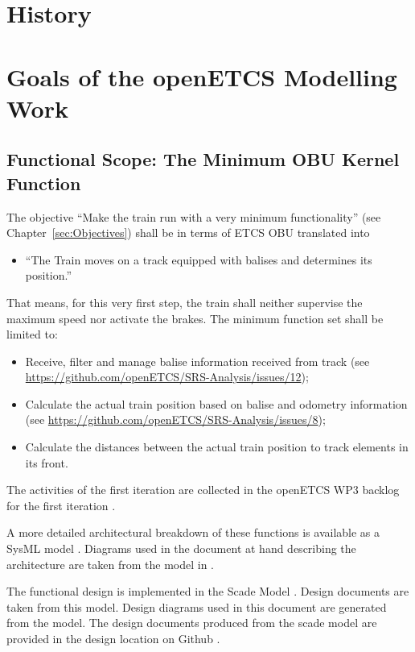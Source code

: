 \documentclass{template/openetcs_report}
\begin{document}
\section{History}

\section{Goals of the openETCS Modelling Work}


\subsection{Functional Scope: The Minimum OBU Kernel Function}
\label{sec:FunctionalScopeTheMinimumOBUKernelFunction}

The objective ``Make the train run with a very minimum functionality'' (see Chapter~\ref{sec:Objectives}) shall be in terms of ETCS OBU translated into 
\begin{itemize}
	\item ``The Train moves on a track equipped with balises and determines its position.''
\end{itemize}
That means, for this very first step, the train shall neither supervise the maximum speed nor activate the brakes. The minimum function set shall be limited to:
\begin{itemize}
	\item Receive, filter and manage balise information received from track (see \url{https://github.com/openETCS/SRS-Analysis/issues/12});
	\item Calculate the actual train position based on balise and odometry information (see \url{https://github.com/openETCS/SRS-Analysis/issues/8});
	\item Calculate the distances between the actual train position to track elements in its front.
\end{itemize}
The activities of the first iteration are collected in the openETCS WP3 backlog for the first iteration \cite{firstIteration}.

A more detailed architectural breakdown of these functions is available as a SysML model \cite{sysml-model}. Diagrams used in the document at hand describing the architecture are taken from the model in \cite{sysml-model}.

The functional design is implemented in the Scade Model \cite{scade-model}. Design documents are taken from this model. Design diagrams used in this document are generated from the model. The design documents produced from the scade model are provided in the design location on Github \cite{designFI}.
\end{document}
